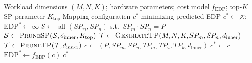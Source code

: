 \begin{algorithm}[H]
\caption{STAR-Map search procedure with structure-based pruning.}\label{alg:search}
\begin{algorithmic}[1]
\REQUIRE Workload dimensions $(M, N, K)$; hardware parameters; cost model $f_{\mathrm{EDP}}$; top-$K$ SP parameter $K_{\mathrm{top}}$
\ENSURE Mapping configuration $c^*$ minimizing predicted EDP
\STATE $c^* \leftarrow \varnothing$;\quad $\mathrm{EDP}^* \leftarrow \infty$
        \STATE $\mathcal{S} \leftarrow$ all $(SP_m, SP_n)$ s.t.\ $SP_m \cdot SP_n = P$
        \STATE $\mathcal{S} \leftarrow \textsc{PruneSP}(\mathcal{S}, d_{\mathrm{inner}}, K_{\mathrm{top}})$ \hfill{}
            \STATE $\mathcal{T} \leftarrow \textsc{GenerateTP}(M, N, K, SP_m, SP_n, d_{\mathrm{inner}})$
            \STATE $\mathcal{T} \leftarrow \textsc{PruneTP}(\mathcal{T}, d_{\mathrm{inner}})$ \hfill{}
                \STATE $c \leftarrow (P, SP_m, SP_n, TP_m, TP_n, TP_k, d_{\mathrm{inner}})$
                    \STATE $c^* \leftarrow c$;\quad $\mathrm{EDP}^* \leftarrow f_{\mathrm{EDP}}(c)$
                \ENDIF
            \ENDFOR
        \ENDFOR
    \ENDFOR
\ENDFOR
\RETURN $c^*$
\end{algorithmic}
\end{algorithm}

